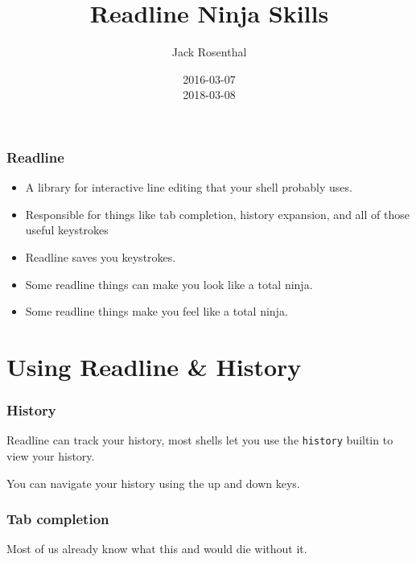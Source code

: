 \documentclass[aspectratio=1610]{beamer}
\title{Readline Ninja Skills}
\author{Jack Rosenthal}
\date{2016-03-07 \\ 2018-03-08}
\begin{document}
\begin{frame}
    \maketitle
\end{frame}

\begin{frame}
    \frametitle{Readline}
    \begin{itemize}[<+->]
        \item A library for interactive line editing that your shell probably uses.
        \item Responsible for things like tab completion, history expansion,
            and all of those useful keystrokes
        \item Readline saves you keystrokes.
        \item Some readline things can make you look like a total ninja.
        \item Some readline things make you feel like a total ninja.
    \end{itemize}
\end{frame}

\section{Using Readline \& History}

\begin{frame}
    \frametitle{History}
    Readline can track your history, most shells let you use the
    \texttt{history} builtin to view your history.

    You can navigate your history using the up and down keys.
\end{frame}

\begin{frame}
    \frametitle{Tab completion}
    Most of us already know what this and would die without it.
\end{frame}
\end{document}
